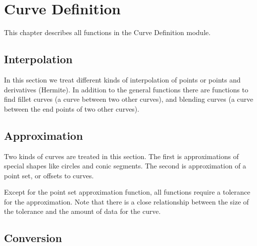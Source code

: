 \chapter{Curve Definition}
\label{curvedefinition}

This chapter describes all functions in the Curve Definition module.
\section{Interpolation}
In this section we treat different kinds of interpolation of
points or points and derivatives (Hermite). In addition to the general
functions there are functions to find fillet curves
(a curve between two other curves),
and blending curves (a curve between the end points of two other curves).

\pgsbreak

\pgsbreak

\pgsbreak

\pgsbreak

\pgsbreak

\pgsbreak

\pgsbreak

\pgsbreak

\pgsbreak

\pgsbreak

\pgsbreak

\pgsbreak
\section{Approximation}
Two kinds of curves are treated in this section.
The first is approximations of special shapes like
circles and conic segments.
The second is approximation of a point set, or offsets to curves.

Except for the point set approximation function, all functions
require a tolerance for the approximation.
Note that there is a close relationship
between the size of the tolerance and the amount of data
for the curve.

\pgsbreak

\pgsbreak

\pgsbreak

\pgsbreak

\pgsbreak

\pgsbreak
\section{Conversion}

\pgsbreak

\pgsbreak

\pgsbreak

\pgsbreak

\pgsbreak

\pgsbreak

\pgsbreak

